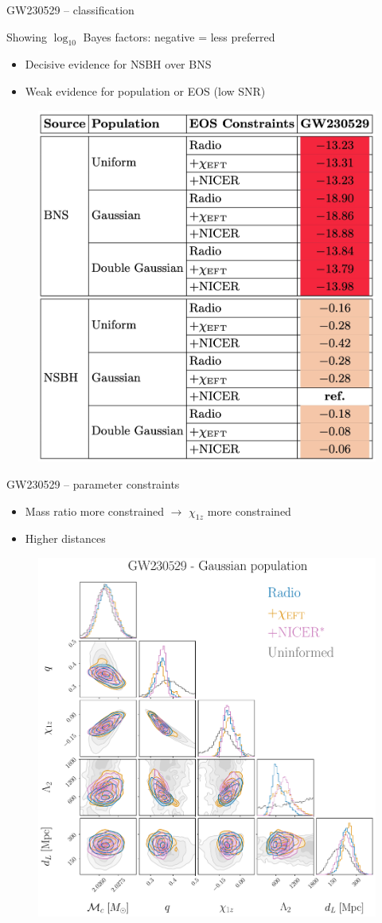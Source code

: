 \documentclass[usenames,dvipsnames,t]{beamer}
\begin{document}
\begin{frame}{GW230529 -- classification}

  Showing $\log_{10}$ Bayes factors: negative = less preferred
  \begin{itemize}
    \item Decisive evidence for NSBH over BNS
    \item Weak evidence for population or EOS (low SNR)
  \end{itemize}

  \begin{figure}
    \centering
    \includegraphics[width=0.50\linewidth]{Figures/GW230529_EOS_source_classification.jpg}
  \end{figure}
\end{frame}


\begin{frame}{GW230529 -- parameter constraints}

  \begin{itemize}
    \item Mass ratio more constrained $\rightarrow$ $\chi_{1z}$ more constrained
    \item Higher distances
  \end{itemize}

  \begin{figure}
    \centering
    \includegraphics[width=0.525\linewidth]{Figures/GW230529_corner_gaussian_nsbh_PRESENTATION.pdf}
  \end{figure}
\end{frame}
\end{document}
